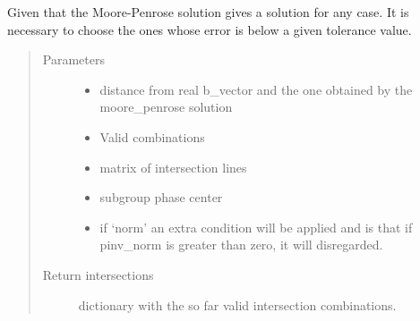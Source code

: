 \documentclass[letterpaper,10pt,english]{sphinxmanual}
\begin{document}
\begin{fulllineitems}
\label{\detokenize{functions:functions.intersections_cal}}
Given that the Moore-Penrose solution gives a solution for any case. It is necessary to choose the ones whose     error is below a given tolerance value.
\begin{quote}\begin{description}
\item[{Parameters}] \leavevmode\begin{itemize}
\item {} 
 \textendash{} distance from real b\_vector and the one obtained by the moore\_penrose solution

\item {} 
 \textendash{} Valid combinations

\item {} 
 \textendash{} matrix of intersection lines

\item {} 
 \textendash{} subgroup phase center

\item {} 
 \textendash{} if ‘norm’ an extra condition will be applied and is that if pinv\_norm is greater than zero, it     will disregarded.

\end{itemize}

\item[{Return intersections}] \leavevmode
dictionary with the so far valid intersection combinations.

\end{description}\end{quote}

\end{fulllineitems}

\end{document}
